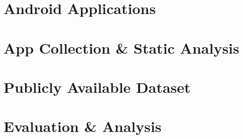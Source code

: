 \documentclass{sig-alternate}
\begin{document}











\label{sec: androidapplications}
\section{Android Applications}




\label{sec: collection}
\section{App Collection \& Static Analysis}






\section{Publicly Available Dataset}
\label{sec:dataset}




\section{Evaluation \& Analysis}
\label{sec: evaluation}





\end{document}
